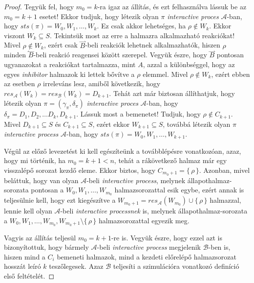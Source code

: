 \documentclass[12pt]{article}
\theoremstyle{definition}
\theoremstyle{remark}
\theoremstyle{plain}
\theoremstyle{remark}
\theoremstyle{plain}
\newcommand{\forwardhat}{\overset{\rightharpoonup}}
\newcommand{\backwardhat}{\overset{\leftharpoonup}}
\newcommand{\res}{\textit{res}}
\begin{document}
\begin{proof}
        Tegyük fel, hogy $m_{0} = k$-ra igaz az állítás, és ezt felhasználva lássuk be az $m_{0} = k + 1$ esetet! Ekkor tudjuk, hogy létezik olyan $\pi$ \textit{interactive proces} $\mathscr{A}$-ban, hogy $\textit{sts}(\pi) = W_{0}, W_{1}, \ldots, W_{k}$. Ez csak akkor lehetséges, ha $\rho \notin W_{k}$. Ekkor viszont $W_{k} \subseteq S$. Tekintsük most az erre a halmazra alkalmazható reakciókat! Mivel $\rho \notin W_{k}$, ezért csak $\forwardhat B$-beli reakciók lehetnek alkalmazhatók, hiszen $\rho$ minden $\backwardhat B$-beli reakció reagensei között szerepel. Vegyük észre, hogy $\forwardhat B$ pontosan ugyanazokat a reakciókat tartalmazza, mint $A$, azzal a különbséggel, hogy az egyes \textit{inhibitor} halmazok ki lettek bővítve a $\rho$ elemmel. Mivel $\rho \notin W_{k}$, ezért ebben az esetben $\rho$ irreleváns lesz, amiből következik, hogy $\res_{\mathscr{A}}(W_{k}) = \res_{\mathscr{B}}(W_{k}) = D_{k + 1}$. Tehát azt már biztosan állíthatjuk, hogy létezik olyan $\pi = (\gamma_{\pi}, \delta_{\pi})$ \textit{interactive proces} $\mathscr{A}$-ban, hogy $\delta_{\pi} = D_{1}, D_{2}, \ldots D_{k}, D_{k + 1}$. Lássuk most a bemenetet! Tudjuk, hogy $\rho \notin C_{k + 1}$. Mivel $D_{k + 1} \subseteq S$ és $C_{k + 1} \subseteq S$, ezért ekkor $W_{k + 1} \subseteq S$, továbbá létezik olyan $\pi$ \textit{interactive process} $\mathscr{A}$-ban, hogy $\textit{sts}(\pi)=W_{0}, W_{1}, \ldots, W_{k + 1}$.

        Végül az előző levezetést ki kell egészíteünk a továbblépésre vonatkozóan, azaz, hogy mi történik, ha $m_{0} = k + 1 < n$, tehát a rákövetkező halmaz már egy visszalépő sorozat kezdő eleme. Ekkor biztos, hogy $C_{m_{0} + 1} = \{\,\rho\,\}$. Azonban, mivel beláttuk, hogy van olyan $\mathscr{A}$-beli \textit{interactive process}, melynek állapothalmaz-sorozata pontosan a $W_{0}, W_{1}, \ldots, W_{m_{0}}$ halmazsorozattal esik egybe, ezért annak is teljesülnie kell, hogy ezt kiegészítve a $W_{m_{0} + 1} = \res_{\mathscr{A}}(W_{m_{0}}) \cup \{\,\rho\,\}$ halmazzal, lennie kell olyan $\mathscr{A}$-beli \textit{interactive processnek} is, melynek állapothalmaz-sorozata a $W_{0}, W_{1}, \ldots, W_{m_{0}}, W_{m_{0} + 1} \setminus \{\,\rho\,\}$ halmazsorozattal egyezik meg.

        Vagyis az állítás teljesül $m_{0} = k + 1$-re is. Vegyük észre, hogy ezzel azt is bizonyítottuk, hogy bármely $\mathscr{A}$-beli \textit{interactive process} megjelenik $\mathscr{B}$-ben is, hiszen mind a $C_{i}$ bemeneti halmazok, mind a kezdeti előrelépő halmazsorozat hosszát leíró $k$ teszőlegesek. Azaz $\mathscr{B}$ teljesíti a szimulációra vonatkozó definíció első feltételét.


\end{proof}
\end{document}
